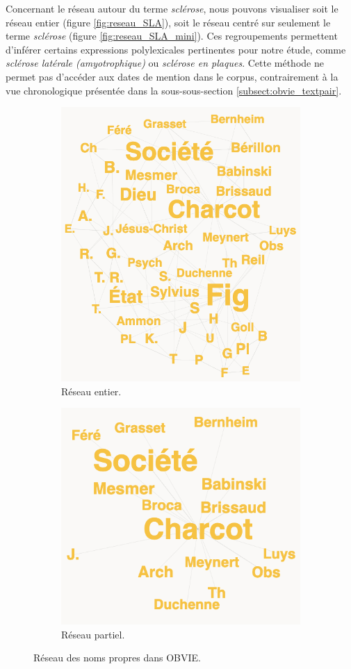 Concernant le réseau autour du terme \textit{sclérose}, nous pouvons visualiser soit le réseau entier (figure \ref{fig:reseau_SLA}), soit le réseau centré sur seulement le terme \textit{sclérose} (figure \ref{fig:reseau_SLA_mini}). Ces regroupements permettent d'inférer certains expressions polylexicales pertinentes pour notre étude, comme \textit{sclérose latérale (amyotrophique)} ou \textit{sclérose en plaques}. Cette méthode ne permet pas d'accéder aux dates de mention dans le corpus, contrairement à la vue chronologique présentée dans la sous-sous-section \ref{subsect:obvie_textpair}. 

\begin{figure}[h]
	\centering
	\begin{subfigure}{.5\textwidth}
		\centering
		\includegraphics[width=.7\linewidth]{img/reseau_noms_propres.png}
		\caption{Réseau entier.}
		\label{fig:reseau_noms_propres_plein}
	\end{subfigure}%
	\begin{subfigure}{.53\textwidth}
		\centering
		\includegraphics[width=.835\linewidth]{img/reseau_noms_propres_mini.png}
		\caption{Réseau partiel.}
		\label{fig:reseau_noms_propres_mini}
	\end{subfigure}
	\caption{Réseau des noms propres dans \textsc{OBVIE}.}
	\label{fig:reseaux_noms_propres}
\end{figure}

